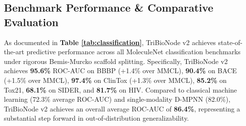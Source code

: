 \documentclass[10pt,twocolumn]{article}
\begin{document}
\begin{table}[!t]
\centering
\caption{Extended Evaluation on Therapeutics Data Commons (TDC) ADMET Pharmacokinetic Benchmarks.}
\label{tab:tdc_admet}
\renewcommand{\arraystretch}{1.22}
\setlength{\tabcolsep}{6pt}
\small
{}
\end{table}

\subsection{Benchmark Performance \& Comparative Evaluation}

As documented in \textbf{Table \ref{tab:classification}}, TriBioNode v2 achieves state-of-the-art predictive performance across all MoleculeNet classification benchmarks under rigorous Bemis-Murcko scaffold splitting. Specifically, TriBioNode v2 achieves \textbf{95.6\%} ROC-AUC on BBBP (+1.4\% over MMCL), \textbf{90.4\%} on BACE (+1.5\% over MMCL), \textbf{97.4\%} on ClinTox (+1.3\% over MMCL), \textbf{85.2\%} on Tox21, \textbf{68.1\%} on SIDER, and \textbf{81.7\%} on HIV. Compared to classical machine learning (72.3\% average ROC-AUC) and single-modality D-MPNN (82.0\%), TriBioNode v2 achieves an overall average ROC-AUC of \textbf{86.4\%}, representing a substantial step forward in out-of-distribution generalizability.
\end{document}
